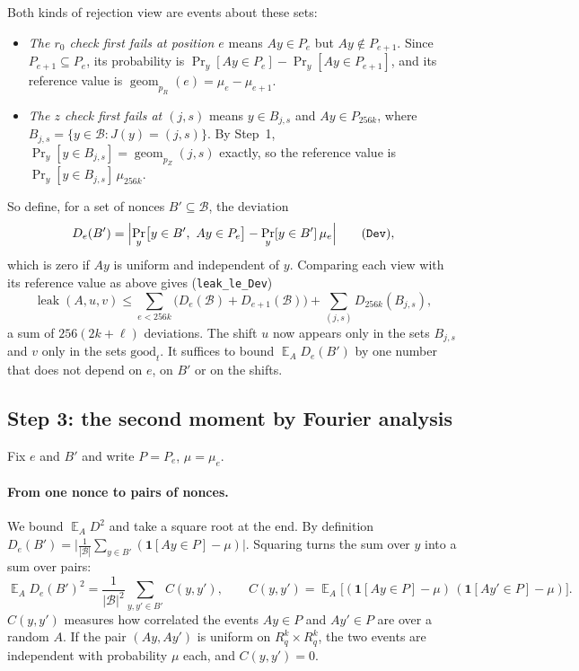 \documentclass[11pt]{article}
\theoremstyle{definition}
\theoremstyle{remark}
\newcommand{\Rq}{R_q}
\newcommand{\E}{\mathop{\mathbb{E}}}
\newcommand{\leak}{\operatorname{leak}}
\newcommand{\geom}{\operatorname{geom}}
\newcommand{\lean}[1]{\texttt{#1}}
\renewcommand{\Pr}{\mathop{\mathrm{Pr}}}
\begin{document}
Both kinds of rejection view are events about these sets:
\begin{itemize}
  \item \emph{The $r_0$ check first fails at position $e$} means $Ay \in P_e$ but
        $Ay\notin P_{e+1}$. Since $P_{e+1}\subseteq P_e$, its probability is
        $\Pr_y[Ay\in P_e] - \Pr_y[Ay\in P_{e+1}]$, and its reference value is
        $\geom_{p_R}(e) = \mu_e - \mu_{e+1}$.
  \item \emph{The $z$ check first fails at $(j,s)$} means $y\in B_{j,s}$ and $Ay\in P_{256k}$,
        where $B_{j,s} = \{y\in\mathcal B : J(y) = (j,s)\}$. By Step~1,
        $\Pr_y[y\in B_{j,s}] = \geom_{p_Z}(j,s)$ exactly, so the reference value is
        $\Pr_y[y\in B_{j,s}]\,\mu_{256k}$.
\end{itemize}
So define, for a set of nonces $B'\subseteq\mathcal{B}$, the deviation
\[
  D_e(B') = \Bigl|\Pr_y\bigl[y\in B',\ Ay \in P_e\bigr] - \Pr_y[y\in B']\,\mu_e\Bigr|
  \qquad(\text{\lean{Dev}}),
\]
which is zero if $Ay$ is uniform and independent of $y$. Comparing each view with its reference
value as above gives (\lean{leak\_le\_Dev})
\[
  \leak(A,u,v) \le \sum_{e<256k}\bigl(D_e(\mathcal B) + D_{e+1}(\mathcal B)\bigr)
    + \sum_{(j,s)} D_{256k}(B_{j,s}),
\]
a sum of $256(2k+\ell)$ deviations. The shift $u$ now appears only in the sets $B_{j,s}$ and $v$
only in the sets $\mathrm{good}_t$. It suffices to bound $\E_A D_e(B')$ by one number that does
not depend on $e$, on $B'$ or on the shifts.

\subsection{Step 3: the second moment by Fourier analysis}

Fix $e$ and $B'$ and write $P = P_e$, $\mu = \mu_e$.

\paragraph{From one nonce to pairs of nonces.}
We bound $\E_A D^2$ and take a square root at the end. By definition
$D_e(B') = \bigl|\frac{1}{|\mathcal B|}\sum_{y\in B'}(\mathbf 1[Ay\in P]-\mu)\bigr|$. Squaring
turns the sum over $y$ into a sum over pairs:
\[
  \E_A D_e(B')^2 = \frac{1}{|\mathcal B|^2}\sum_{y,y'\in B'} C(y,y'),\qquad
  C(y,y') = \E_A\bigl[(\mathbf 1[Ay\in P]-\mu)\,(\mathbf 1[Ay'\in P]-\mu)\bigr].
\]
$C(y,y')$ measures how correlated the events $Ay\in P$ and $Ay'\in P$ are over a random $A$. If
the pair $(Ay,Ay')$ is uniform on $\Rq^k\times\Rq^k$, the two events are independent with
probability $\mu$ each, and $C(y,y')=0$.
\end{document}

